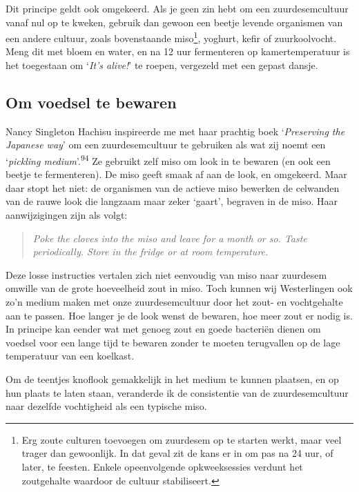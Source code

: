 \documentclass[
  11pt,
  dutch,
]{memoir}
\begin{document}
Dit principe geldt ook omgekeerd. Als je geen zin hebt om een
zuurdesemcultuur vanaf nul op te kweken, gebruik dan gewoon een beetje
levende organismen van een andere cultuur, zoals bovenstaande
miso\footnote{Erg zoute culturen toevoegen om zuurdesem op te starten
  werkt, maar veel trager dan gewoonlijk. In dat geval zit de kans er in
  om pas na 24 uur, of later, te feesten. Enkele opeenvolgende
  opkweeksessies verdunt het zoutgehalte waardoor de cultuur
  stabiliseert.}, yoghurt, kefir of zuurkoolvocht. Meng dit met bloem en
water, en na 12 uur fermenteren op kamertemperatuur is het toegestaan om
`\emph{It's alive!}' te roepen, vergezeld met een gepast dansje.

\hypertarget{om-voedsel-te-bewaren}{%
\subsection{Om voedsel te bewaren}\label{om-voedsel-te-bewaren}}

Nancy Singleton Hachisu inspireerde me met haar prachtig boek
`\emph{Preserving the Japanese way}' om een zuurdesemcultuur te
gebruiken als wat zij noemt een `\emph{pickling
medium}'.\textsuperscript{94} Ze gebruikt zelf miso om look in te
bewaren (en ook een beetje te fermenteren). De miso geeft smaak af aan
de look, en omgekeerd. Maar daar stopt het niet: de organismen van de
actieve miso bewerken de celwanden van de rauwe look die langzaam maar
zeker `gaart', begraven in de miso. Haar aanwijzigingen zijn als volgt:

\begin{quote}
\emph{Poke the cloves into the miso and leave for a month or so. Taste
periodically. Store in the fridge or at room temperature.}
\end{quote}

Deze losse instructies vertalen zich niet eenvoudig van miso naar
zuurdesem omwille van de grote hoeveelheid zout in miso. Toch kunnen wij
Westerlingen ook zo'n medium maken met onze zuurdesemcultuur door het
zout- en vochtgehalte aan te passen. Hoe langer je de look wenst de
bewaren, hoe meer zout er nodig is. In principe kan eender wat met
genoeg zout en goede bacteriën dienen om voedsel voor een lange tijd te
bewaren zonder te moeten terugvallen op de lage temperatuur van een
koelkast.

Om de teentjes knoflook gemakkelijk in het medium te kunnen plaatsen, en
op hun plaats te laten staan, veranderde ik de consistentie van de
zuurdesemcultuur naar dezelfde vochtigheid als een typische miso.
\end{document}
